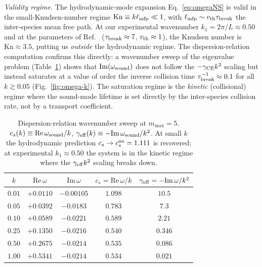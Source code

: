 \documentclass[aps,pre,twocolumn,superscriptaddress,longbibliography,floatfix]{revtex4-2}
\begin{document}
\emph{Validity regime.} The hydrodynamic-mode expansion
Eq.~\eqref{eq:omegaNS} is valid in the small-Knudsen-number
regime $\mathrm{Kn}\equiv k\ell_{\rm mfp}\ll 1$, with
$\ell_{\rm mfp}\sim v_{\rm th}\tau_{\rm break}$ the
inter-species mean free path. At our experimental
wavenumber $k_1=2\pi/L\approx 0.50$ and at the parameters
of Ref.~\cite{PaperII} ($\tau_{\rm break}\approx 7$,
$v_{\rm th}\approx 1$), the Knudsen number is
$\mathrm{Kn}\approx 3.5$, putting us \emph{outside} the
hydrodynamic regime. The dispersion-relation computation
confirms this directly: a wavenumber sweep of the eigenvalue
problem (Table~\ref{tab:omega-k}) shows that
$\mathrm{Im}(\omega_{\rm sound})$ does not follow the
$-\gamma_{\rm CE}k^2$ scaling but instead saturates at a
value of order the inverse collision time
$\tau_{\rm break}^{-1}\approx 0.1$ for all $k\gtrsim 0.05$
(Fig.~\ref{fig:omega-k}).
The saturation regime is the \emph{kinetic} (collisional)
regime where the sound-mode lifetime is set directly by the
inter-species collision rate, not by a transport
coefficient.

\begin{table}[htbp]
\caption{Dispersion-relation wavenumber sweep at $m_{\max}=5$.
$c_s(k)\equiv\mathrm{Re}\,\omega_{\rm sound}/k$,
$\gamma_{\rm eff}(k)\equiv-\mathrm{Im}\,\omega_{\rm sound}/k^2$.
At small $k$ the hydrodynamic prediction
$c_s\to c_s^{\rm an}=1.111$ is recovered; at experimental
$k_1\approx 0.50$ the system is in the kinetic regime where
the $\gamma_{\rm eff}k^2$ scaling breaks down.}
\label{tab:omega-k}
\centering
\begin{tabular}{c|cccc}
\hline\hline
$k$ & $\mathrm{Re}\,\omega$ & $\mathrm{Im}\,\omega$
& $c_s=\mathrm{Re}\,\omega/k$
& $\gamma_{\rm eff}=-\mathrm{Im}\,\omega/k^2$ \\
\hline
$0.01$ & $+0.0110$ & $-0.00105$ & $1.098$ & $10.5$ \\
$0.05$ & $+0.0392$ & $-0.0183$  & $0.783$ & $7.3$  \\
$0.10$ & $+0.0589$ & $-0.0221$  & $0.589$ & $2.21$ \\
$0.25$ & $+0.1350$ & $-0.0216$  & $0.540$ & $0.346$ \\
$0.50$ & $+0.2675$ & $-0.0214$  & $0.535$ & $0.086$ \\
$1.00$ & $+0.5341$ & $-0.0214$  & $0.534$ & $0.021$ \\
\hline\hline
\end{tabular}
\end{table}
\end{document}
